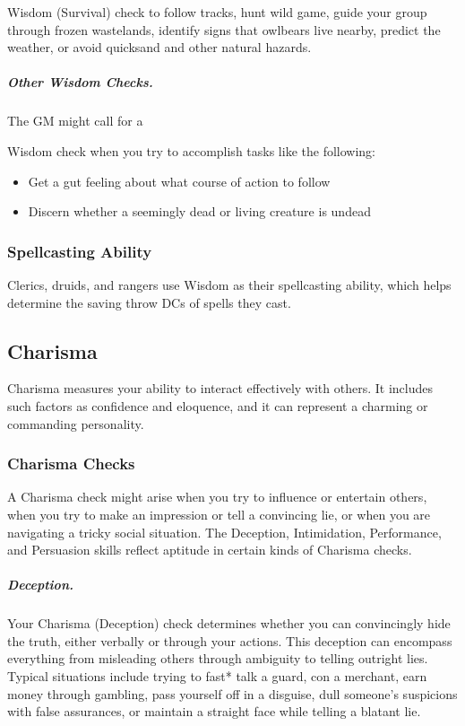 Wisdom (Survival) check to follow tracks, hunt wild game, guide your group through frozen wastelands, identify signs that owlbears live nearby, predict the weather, or avoid quicksand and other natural hazards.

\subparagraph*{Other Wisdom Checks.} The GM might call for a

Wisdom check when you try to accomplish tasks like the following:

\begin{itemize}
    \item Get a gut feeling about what course of action to follow
    \item Discern whether a seemingly dead or living creature is undead
\end{itemize}

\subsubsection{Spellcasting Ability}

Clerics, druids, and rangers use Wisdom as their spellcasting ability, which helps determine the saving throw DCs of spells they cast.

\subsection{Charisma}

Charisma measures your ability to interact effectively with others. It includes such factors as confidence and eloquence, and it can represent a charming or commanding personality.

\subsubsection{Charisma Checks}

A Charisma check might arise when you try to influence or entertain others, when you try to make an impression or tell a convincing lie, or when you are navigating a tricky social situation. The Deception, Intimidation, Performance, and Persuasion skills reflect aptitude in certain kinds of Charisma checks.

\subparagraph*{Deception.} Your Charisma (Deception) check determines whether you can convincingly hide the truth, either verbally or through your actions. This deception can encompass everything from misleading others through ambiguity to telling outright lies. Typical situations include trying to fast* talk a guard, con a merchant, earn money through gambling, pass yourself off in a disguise, dull someone's suspicions with false assurances, or maintain a straight face while telling a blatant lie.

